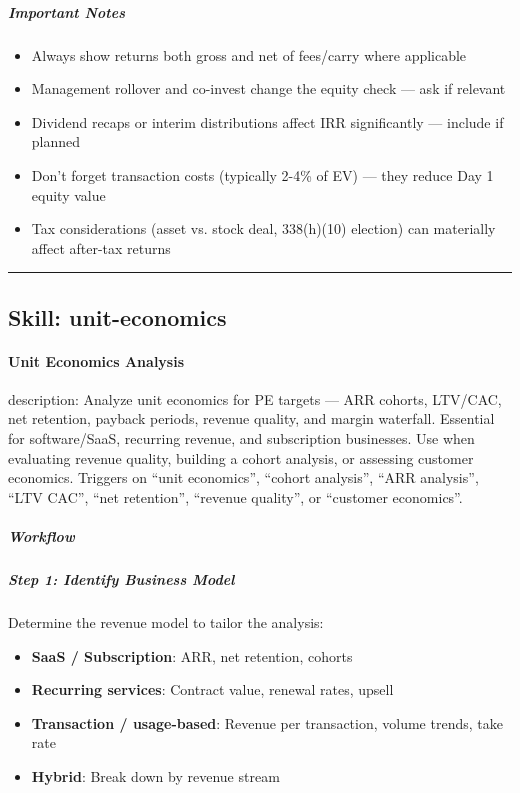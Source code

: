 \documentclass[11pt]{article}
\begin{document}
\subparagraph{Important Notes}\mbox{}\par

\begin{itemize}[leftmargin=*,itemsep=2pt,topsep=2pt]
\item {} Always show returns both gross and net of fees/carry where applicable
\item {} Management rollover and co-invest change the equity check — ask if relevant
\item {} Dividend recaps or interim distributions affect IRR significantly — include if planned
\item {} Don't forget transaction costs (typically 2-4\% of EV) — they reduce Day 1 equity value
\item {} Tax considerations (asset vs. stock deal, 338(h)(10) election) can materially affect after-tax returns
\end{itemize}

\vspace{0.8em}\hrule\vspace{0.8em}

\subsection{Skill: unit-economics}\label{file:skills-unit-economics-SKILL.md}

\paragraph{Unit Economics Analysis}\mbox{}\par

description: Analyze unit economics for PE targets — ARR cohorts, LTV/CAC, net retention, payback periods, revenue quality, and margin waterfall. Essential for software/SaaS, recurring revenue, and subscription businesses. Use when evaluating revenue quality, building a cohort analysis, or assessing customer economics. Triggers on ``unit economics'', ``cohort analysis'', ``ARR analysis'', ``LTV CAC'', ``net retention'', ``revenue quality'', or ``customer economics''.


\subparagraph{Workflow}\mbox{}\par

\subparagraph{Step 1: Identify Business Model}\mbox{}\par

Determine the revenue model to tailor the analysis:

\begin{itemize}[leftmargin=*,itemsep=2pt,topsep=2pt]
\item {} \textbf{SaaS / Subscription}: ARR, net retention, cohorts
\item {} \textbf{Recurring services}: Contract value, renewal rates, upsell
\item {} \textbf{Transaction / usage-based}: Revenue per transaction, volume trends, take rate
\item {} \textbf{Hybrid}: Break down by revenue stream
\end{itemize}
\end{document}
